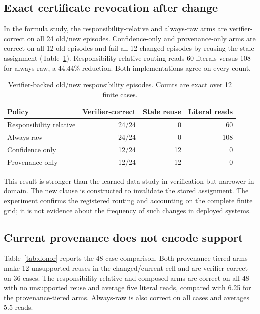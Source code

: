 \documentclass[10pt]{article}
\begin{document}
\subsection{Exact certificate revocation after change}

In the formula study, the responsibility-relative and always-raw arms are verifier-correct on all 24 old/new episodes. Confidence-only and provenance-only arms are correct on all 12 old episodes and fail all 12 changed episodes by reusing the stale assignment (Table~\ref{tab:cnf}). Responsibility-relative routing reads 60 literals versus 108 for always-raw, a 44.44\% reduction. Both implementations agree on every count.

\begin{table}[t]
\centering
\small
\caption{Verifier-backed old/new responsibility episodes. Counts are exact over 12 finite cases.}
\label{tab:cnf}
\begin{tabular}{lrrr}
\toprule
Policy & Verifier-correct & Stale reuse & Literal reads \\
\midrule
Responsibility relative & 24/24 & 0 & 60 \\
Always raw & 24/24 & 0 & 108 \\
Confidence only & 12/24 & 12 & 0 \\
Provenance only & 12/24 & 12 & 0 \\
\bottomrule
\end{tabular}
\end{table}

This result is stronger than the learned-data study in verification but narrower in domain. The new clause is constructed to invalidate the stored assignment. The experiment confirms the registered routing and accounting on the complete finite grid; it is not evidence about the frequency of such changes in deployed systems.

\subsection{Current provenance does not encode support}

Table~\ref{tab:donor} reports the 48-case comparison. Both provenance-tiered arms make 12 unsupported reuses in the changed/current cell and are verifier-correct on 36 cases. The responsibility-relative and composed arms are correct on all 48 with no unsupported reuse and average five literal reads, compared with 6.25 for the provenance-tiered arms. Always-raw is also correct on all cases and averages 5.5 reads.
\end{document}
